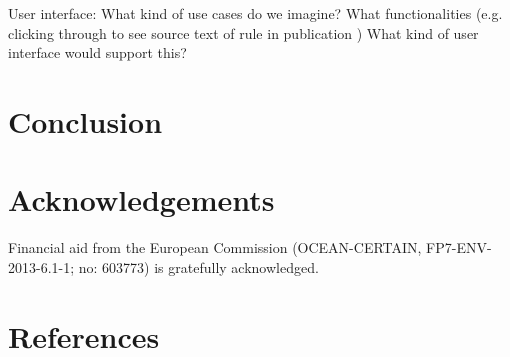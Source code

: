 \documentclass[10pt, a4paper]{article}
\begin{document}
User interface:
What kind of use cases do we imagine?
What functionalities (e.g. clicking through to see source text of rule in publication )
What kind of user interface would support this? 

\section{Conclusion}


\section{Acknowledgements}
Financial aid from the European Commission (OCEAN-CERTAIN, FP7-ENV-2013-6.1-1; no: 603773) is gratefully acknowledged. 


\section{References}



\end{document}
